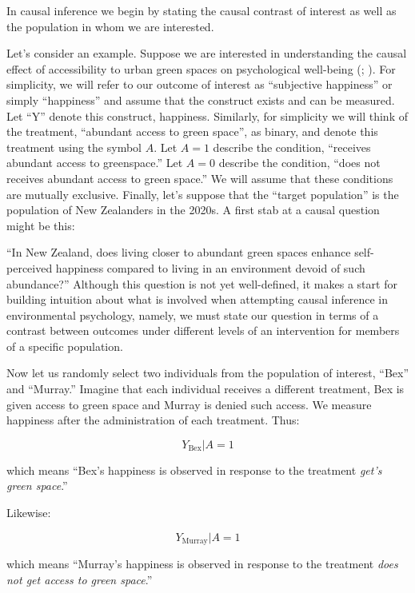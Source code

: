 \documentclass[
  singlecolumn]{article}
\begin{document}
In causal inference we begin by stating the causal contrast of interest
as well as the population in whom we are interested.

Let's consider an example. Suppose we are interested in understanding
the causal effect of accessibility to urban green spaces on
psychological well-being (; ). For simplicity, we will refer to our outcome of interest as
``subjective happiness'' or simply ``happiness'' and assume that the
construct exists and can be measured. Let ``Y'' denote this construct,
happiness. Similarly, for simplicity we will think of the treatment,
``abundant access to green space'', as binary, and denote this treatment
using the symbol \(A\). Let \(A = 1\) describe the condition, ``receives
abundant access to greenspace.'' Let \(A = 0\) describe the condition,
``does not receives abundant access to green space.'' We will assume
that these conditions are mutually exclusive. Finally, let's suppose
that the ``target population'' is the population of New Zealanders in
the 2020s. A first stab at a causal question might be this:

``In New Zealand, does living closer to abundant green spaces enhance
self-perceived happiness compared to living in an environment devoid of
such abundance?'' Although this question is not yet well-defined, it
makes a start for building intuition about what is involved when
attempting causal inference in environmental psychology, namely, we must
state our question in terms of a contrast between outcomes under
different levels of an intervention for members of a specific
population.

Now let us randomly select two individuals from the population of
interest, ``Bex'' and ``Murray.'' Imagine that each individual receives
a different treatment, Bex is given access to green space and Murray is
denied such access. We measure happiness after the administration of
each treatment. Thus:

\[Y_{\text{Bex}}|A = 1 \]

which means ``Bex's happiness is observed in response to the treatment
\emph{get's green space}.''

Likewise:

\[Y_{\text{Murray}}|A = 1 \]

which means ``Murray's happiness is observed in response to the
treatment \emph{does not get access to green space}.''
\end{document}
